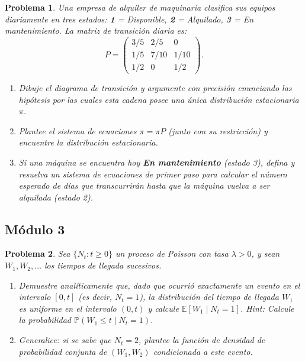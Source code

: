 \documentclass[12pt]{article}
\newtheorem{problem}{Problema}
\begin{document}
\begin{problem} Una empresa de alquiler de maquinaria clasifica sus equipos diariamente en tres estados: \textbf{1} = Disponible, \textbf{2} = Alquilado, \textbf{3} = En mantenimiento. La matriz de transición diaria es:
\[
P = \begin{pmatrix}
3/5 & 2/5 & 0   \\[4pt]
1/5 & 7/10& 1/10\\[4pt]
1/2 & 0   & 1/2
\end{pmatrix}.
\]
\begin{enumerate}
    \item[(a)] Dibuje el diagrama de transición y argumente con precisión enunciando las hipótesis por las cuales esta cadena posee una única distribución estacionaria $\pi$.
    \item[(b)] Plantee el sistema de ecuaciones $\pi = \pi P$ (junto con su restricción) y encuentre la distribución estacionaria.
    \item[(c)] Si una máquina se encuentra hoy \textbf{En mantenimiento} (estado 3), defina y resuelva un sistema de ecuaciones de primer paso para calcular el número esperado de días que transcurrirán hasta que la máquina vuelva a ser alquilada (estado 2).
\end{enumerate}
\end{problem}


\subsection*{Módulo 3}

\begin{problem} Sea $\{N_t : t \geq 0\}$ un proceso de Poisson con tasa $\lambda > 0$, y sean $W_1, W_2, \ldots$ los tiempos de llegada sucesivos. 
\begin{enumerate}
    \item[(a)] Demuestre analíticamente que, dado que ocurrió exactamente un evento en el intervalo $[0, t]$ (es decir, $N_t = 1$), la distribución del tiempo de llegada $W_1$ es uniforme en el intervalo $(0, t)$ y calcule $\mathbb{E}[W_1 \mid N_t = 1]$. Hint: Calcule la probabilidad $\mathbb{P}(W_1 \le t \mid N_t = 1)$.
    \item[(b)] Generalice: si se sabe que $N_t = 2$, plantee la función de densidad de probabilidad conjunta de $(W_1, W_2)$ condicionada a este evento. 
\end{enumerate}
\end{problem}
\end{document}
